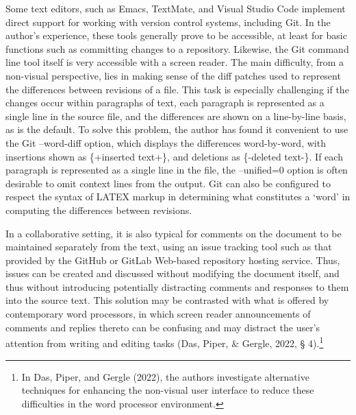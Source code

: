 \documentclass[11pt]{sig-alternate}
\begin{document}
\begin{large}
Some text editors, such as Emacs, TextMate, and Visual Studio Code implement direct support for working with version control systems, including Git. In the author’s experience, these tools generally prove to be accessible, at least for basic functions such as committing changes to a repository. Likewise, the Git command line tool itself is very accessible with a screen reader. The main difficulty, from a non-visual perspective, lies in making sense of the diff patches used to represent the differences between revisions of a file. This task is especially challenging if the changes occur within paragraphs of text, each paragraph is represented as a single line in the source file, and the differences are shown on a line-by-line basis, as is the default. To solve this problem, the author has found it convenient to use the Git --word-diff option, which displays the differences word-by-word, with insertions shown as \{+inserted text+\}, and deletions as \{-deleted text-\}. If each paragraph is represented as a single line in the file, the --unified=0 option is often desirable to omit context lines from the output. Git can also be configured to respect the syntax of LATEX markup in determining what constitutes a ‘word’ in computing the differences between revisions.

In a collaborative setting, it is also typical for comments on the document to be maintained separately from the text, using an issue tracking tool such as that provided by the GitHub or GitLab Web-based repository hosting service. Thus, issues can be created and discussed without modifying the document itself, and thus without introducing potentially distracting comments and responses to them into the source text. This solution may be contrasted with what is offered by contemporary word processors, in which screen reader announcements of comments and replies thereto can be confusing and may distract the user’s attention from writing and editing tasks (Das, Piper, \& Gergle, 2022, § 4).\footnote{In Das, Piper, and Gergle (2022), the authors investigate alternative techniques for enhancing the non-visual user interface to reduce these difficulties in the word processor environment.}


\end{large}
\end{document}
